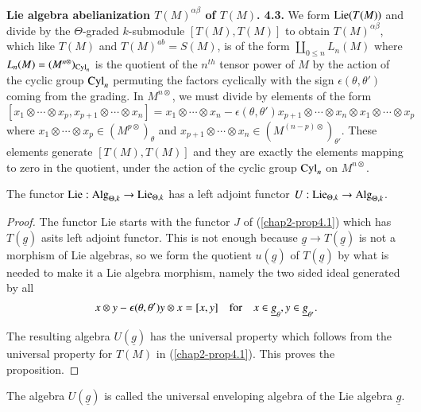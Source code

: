 \medskip
\noindent
{\bf Lie algebra abelianization {\boldmath$T(M)^{\alpha\beta}$} of
  {\boldmath$T(M)$}. 4.3.} We form $\operatorname{Lie}(T(M))$ and divide by the
$\Theta$-graded $k$-submodule $[T(M),T(M)]$ to obtain\break
$T(M)^{\alpha\beta}$, which like $T(M)$ and $T(M)^{ab}=S(M)$, is of
the form $\coprod\limits_{0\leq n}L_{n}(M)$ where
$L_{n}(M)=(M^{n\otimes})_{\operatorname{Cyl}_{n}}$ is the quotient of the $n^{th}$
tensor power of $M$ by the action of the cyclic group $\operatorname{Cyl}_{n}$
permuting the factors cyclically with the sign
$\epsilon(\theta,\theta')$ coming from the grading. In $M^{n\otimes}$,
we must divide by elements of the form
{\fontsize{10}{12}\selectfont
$$
[x_{1}\otimes\cdots\otimes x_{p},x_{p+1}\otimes\cdots\otimes
  x_{n}]=x_{1}\otimes\cdots\otimes
x_{n}-\epsilon(\theta,\theta')x_{p+1}\otimes\cdots\otimes x_{n}\otimes
x_{1}\otimes\cdots\otimes x_{p}
$$} 
where $x_{1}\otimes\cdots\otimes x_{p}\in (M^{p\otimes})_{\theta}$ and
$x_{p+1}\otimes\cdots\otimes x_{n}\in
(M^{(n-p)\otimes})_{\theta'}$. These elements generate $[T(M),T(M)]$
and they are exactly the elements mapping to zero in the quotient,
under the action of the cyclic group $\operatorname{Cyl}_{n}$ on $M^{n\otimes}$. 

\setcounter{theorem}{3}
\begin{proposition}\label{chap2-prop4.4}
The functor $\operatorname{Lie}:\operatorname{Alg}_{\Theta,k}\to \operatorname{Lie}_{\Theta,k}$ has a left
adjoint functor $U:\operatorname{Lie}_{\Theta,k}\to \operatorname{Alg}_{\Theta,k}$.
\end{proposition}

\begin{proof}
The functor Lie starts with the functor $J$ of (\ref{chap2-prop4.1})
which has $T(\underline{g})$ as\pageoriginale its left adjoint
functor. This is not enough because $\underline{g}\to
T(\underline{g})$ is not a morphism of Lie algebras, so we form the
quotient $u(\underline{g})$ of $T(\underline{g})$ by what is needed to
make it a Lie algebra morphism, namely the two sided ideal generated
by all
$$
x\otimes y-\epsilon(\theta,\theta')y\otimes x=[x,y]\quad\text{for}\quad x\in
\underline{g}_{\theta}, y\in \underline{g}_{\theta'}. 
$$

The resulting algebra $U(\underline{g})$ has the universal property
which follows from the universal property for $T(M)$ in
(\ref{chap2-prop4.1}). This proves the proposition.
\end{proof}

\begin{definition}\label{chap2-defi4.5}
The algebra $U(\underline{g})$ is called the universal enveloping
algebra of the Lie algebra $\underline{g}$.
\end{definition}

